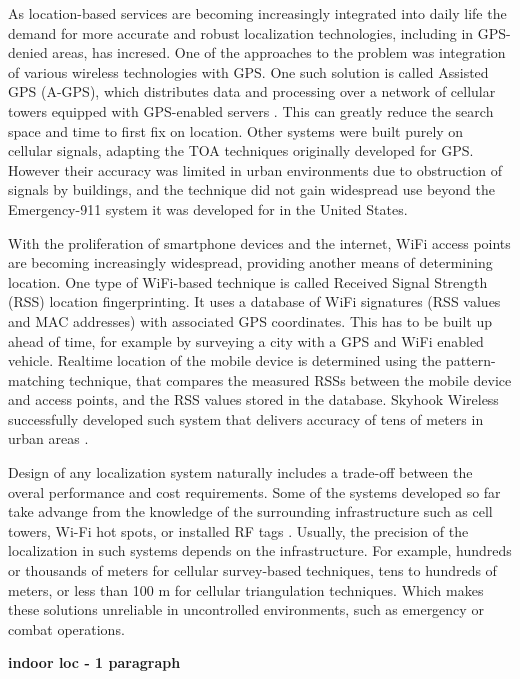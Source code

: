 As location-based services are becoming increasingly integrated into daily life  the demand for more accurate and robust localization technologies, including in GPS-denied areas, has incresed. One of the approaches to the problem was integration of various wireless technologies with GPS. One such solution is called Assisted GPS (A-GPS), which distributes data and processing over a network of cellular towers equipped with GPS-enabled servers \cite{AGPS}. This can greatly reduce the search space and time to first fix on location. Other systems were built purely on cellular signals, adapting the TOA techniques originally developed for GPS. However their accuracy was limited in urban environments due to obstruction of signals by buildings, and the technique did not gain widespread use beyond the Emergency-911 system it was developed for in the United States.


With the proliferation of smartphone devices and the internet, WiFi access points are becoming increasingly widespread, providing another means of determining location. One type of WiFi-based technique is called Received Signal Strength (RSS) location fingerprinting. It uses a database of WiFi signatures (RSS values and MAC addresses) with associated GPS coordinates. This has to be built up ahead of time, for example by surveying a city with a GPS and WiFi enabled vehicle. 
Realtime location of the mobile device is determined using the pattern-matching technique, that compares the measured RSSs between the mobile device and access points, and the RSS values stored in the database. Skyhook Wireless successfully developed such system that delivers accuracy of tens of meters in urban areas \cite{Skyhook}. 

Design of any localization system naturally includes a trade-off between the overal performance and cost requirements. Some of the systems developed so far take advange from the knowledge of the surrounding infrastructure such as
cell towers, Wi-Fi hot spots, or installed RF tags \cite{GeoLoc}. Usually, the precision of the localization in such systems depends on the infrastructure. For example,  hundreds or thousands of meters for cellular survey-based techniques, tens to hundreds of meters, or less than 100 m for cellular triangulation techniques. Which makes these solutions unreliable in uncontrolled environments, such as emergency or combat operations.

\textbf{indoor loc - 1 paragraph}



